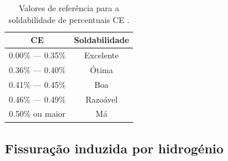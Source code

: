 \begin{table}[htb]
    \centering
    \caption[Valores de referência para a soldabilidade de percentuais CE]%
    {Valores de referência para a soldabilidade de percentuais CE \cite{Vladimir2000}.}
    \label{tab:CE}
    \begin{tabular}{cc} 
    \toprule
    CE              & Soldabilidade  \\ 
    \hline\hline
    0.00\% — 0.35\% & Excelente      \\
    0.36\% — 0.40\% & Ótima          \\
    0.41\% — 0.45\% & Boa            \\
    0.46\% — 0.49\% & Razoável       \\
    0.50\% ou maior & Má             \\
    \bottomrule
    \end{tabular}
\end{table}
\subsection{Fissuração induzida por hidrogénio}\label{ssec:soldadura-fissuracao}

